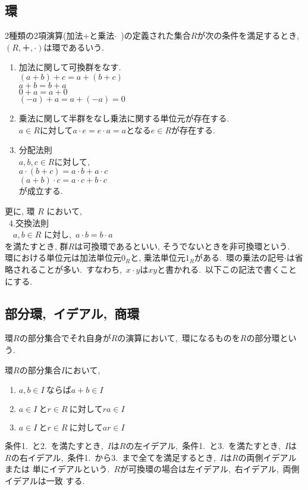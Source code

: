 \subsection{環}
2種類の2項演算(加法$+$と乗法$\cdot$\ )の定義された集合$R$が次の条件を満足するとき, $(R,＋,\cdot)$は環であるいう.\\
\begin{enumerate}
 \item 加法に関して可換群をなす.\\
 $(a+b)+c=a+(b+c)$\\
 $a+b=b+a$\\
 $0+a=a+0$\\
 $(-a)+a=a+(-a)=0$\\
 \item 乗法に関して半群をなし乗法に関する単位元が存在する.\\
 $a \in R$に対して$a \cdot e=e \cdot a=a$となる$e \in R$が存在する.\\
 \item 分配法則\\
 $a,b,c \in R$に対して,\\
 $a \cdot (b+c)=a \cdot b+a \cdot c$\\
 $(a+b) \cdot c=a \cdot c+b \cdot c$\\
 が成立する.\ 
\end{enumerate}

更に, 環 $R$ において,\\
\quad \ 4.交換法則\\
\quad \quad \ \ $a,b \in R$ に対し,\ $a \cdot b=b \cdot a$ \\
を満たすとき, 群$R$は可換環であるといい, そうでないときを非可換環という.\\
環における単位元は加法単位元$0_{R}$と, 乗法単位元$1_{R}$がある.\
環の乗法の記号$\cdot$は省略されることが多い.\ すなわち,\ 
$x \cdot y$は$xy$と書かれる.\ 以下この記法で書くことにする.

\subsection{部分環,\ イデアル,\ 商環}
環$R$の部分集合でそれ自身が$R$の演算において,\ 環になるものを$R$の部分環という. 


環$R$の部分集合$I$において,\
\begin{enumerate}
 \item $a,b \in I\ ならばa+b \in I$
 \item $a \in I\ とr \in R\ に対してra \in I$
 \item $a \in I\ とr \in R\ に対してar \in I$
\end{enumerate}
条件1.\ と2.\ を満たすとき,\ $IはR$の左イデアル,\ 条件1.\ と3.\ を満たすとき,\ $I$は
$R$の右イデアル,\ 条件1.\ から3.\ まで全てを満足するとき,\ $IはRの$両側イデアルまたは
単にイデアルという.\ $R$が可換環の場合は左イデアル,\ 右イデアル,\ 両側イデアルは一致
する.


